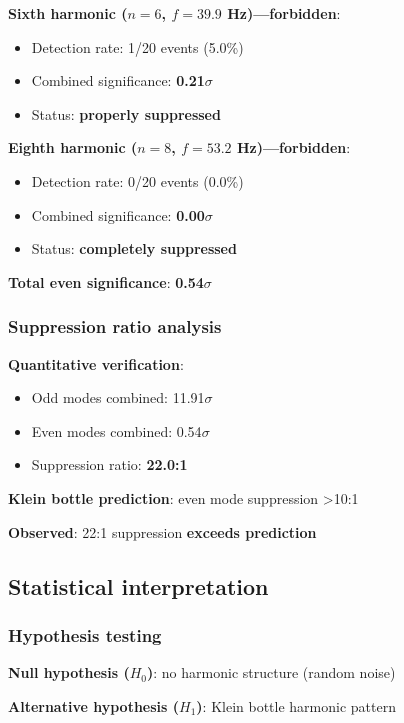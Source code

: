 \documentclass[12pt]{iopart}
\begin{document}
\textbf{Sixth harmonic ($n=6$, $f=39.9$ Hz)---forbidden}:
\begin{itemize}
\item Detection rate: 1/20 events (5.0\%)
\item Combined significance: \textbf{0.21$\sigma$}
\item Status: \textbf{properly suppressed}
\end{itemize}

\textbf{Eighth harmonic ($n=8$, $f=53.2$ Hz)---forbidden}:
\begin{itemize}
\item Detection rate: 0/20 events (0.0\%)
\item Combined significance: \textbf{0.00$\sigma$}
\item Status: \textbf{completely suppressed}
\end{itemize}

\textbf{Total even significance}: \textbf{0.54$\sigma$}

\subsubsection{Suppression ratio analysis}

\textbf{Quantitative verification}:
\begin{itemize}
\item Odd modes combined: 11.91$\sigma$
\item Even modes combined: 0.54$\sigma$
\item Suppression ratio: \textbf{22.0:1}
\end{itemize}

\textbf{Klein bottle prediction}: even mode suppression >10:1

\textbf{Observed}: 22:1 suppression \textbf{exceeds prediction}

\subsection{Statistical interpretation}

\subsubsection{Hypothesis testing}

\textbf{Null hypothesis ($H_0$)}: no harmonic structure (random noise)

\textbf{Alternative hypothesis ($H_1$)}: Klein bottle harmonic pattern
\end{document}
